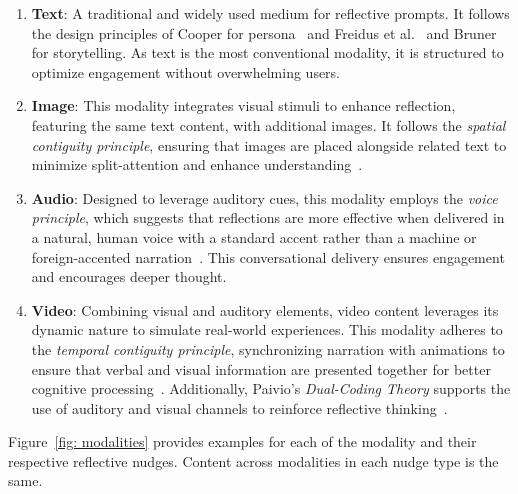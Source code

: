 \begin{enumerate}
    \item \textbf{Text}: A traditional and widely used medium for reflective prompts. It follows the design principles of Cooper for persona~\cite{cooper1999inmates, cooper2007face, pruitt2010persona} and Freidus et al.~\cite{freidus2002digital} and Bruner~\cite{bruner1991narrative} for storytelling. As text is the most conventional modality, it is structured to optimize engagement without overwhelming users.
    \item \textbf{Image}: This modality integrates visual stimuli to enhance reflection, featuring the same text content, with additional images. It follows the \textit{spatial contiguity principle}, ensuring that images are placed alongside related text to minimize split-attention and enhance understanding~\cite{hegarty1993constructing, ayres2005split, moreno1999cognitive, mayer1989systematic, mayer1995generative, chandler1992split}. 
    \item \textbf{Audio}: Designed to leverage auditory cues, this modality employs the \textit{voice principle}, which suggests that reflections are more effective when delivered in a natural, human voice with a standard accent rather than a machine or foreign-accented narration~\cite{atkinson2005fostering}. This conversational delivery ensures engagement and encourages deeper thought.    
    \item \textbf{Video}: Combining visual and auditory elements, video content leverages its dynamic nature to simulate real-world experiences. This modality adheres to the \textit{temporal contiguity principle}, synchronizing narration with animations to ensure that verbal and visual information are presented together for better cognitive processing~\cite{moreno1999cognitive, mayer1991animations, mayer1992instructive, mousavi1995reducing}. Additionally, Paivio’s \textit{Dual-Coding Theory} supports the use of auditory and visual channels to reinforce reflective thinking~\cite{paivio2013imagery}.
\end{enumerate}

Figure~\ref{fig: modalities} provides examples for each of the modality and their respective reflective nudges. Content across modalities in each nudge type is the same.

